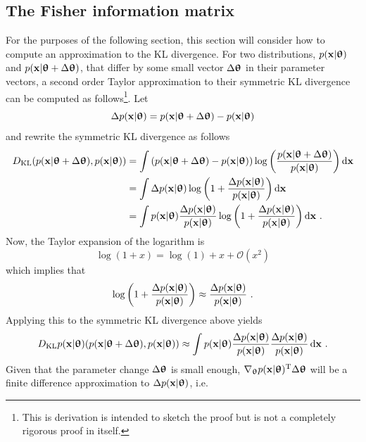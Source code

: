 \subsection{The Fisher information matrix}\label{sec: Natural Gradient - Fischer information matrix}
For the purposes of the following section, this section will consider how to compute an approximation to the \gls{KL} divergence.
For two distributions, $p(\x|\thetab)$ and $p(\x|\thetab+\Delta\thetab)$, that differ by some small vector $\Delta\thetab$ in their parameter vectors, a second order Taylor approximation to their symmetric \gls{KL} divergence can be computed as follows\footnote{This is derivation is intended to sketch the proof but is not a completely rigorous proof in itself.}. Let
$$\Delta p(\x|\thetab)=p(\x|\thetab+\Delta\thetab)-p(\x|\thetab)$$
and rewrite the symmetric \gls{KL} divergence as follows
\begin{align}
    D_\text{KL}(p(\x|\thetab+\Delta\thetab),p(\x|\thetab))
    &= \int \pa{p(\x|\thetab+\Delta\thetab)-p(\x|\thetab)}\log\pa{\frac{p(\x|\thetab+\Delta\thetab)}{p(\x|\thetab)}}\,\text{d}\x\nonumber\\
    &= \int \Delta p(\x|\thetab)\log\pa{1+\frac{\Delta p(\x|\thetab)}{p(\x|\thetab)}}\,\text{d}\x\nonumber\\
    &= \int p(\x|\thetab)\frac{\Delta p(\x|\thetab)}{p(\x|\thetab)}\log\pa{1+\frac{\Delta p(\x|\thetab)}{p(\x|\thetab)}}\,\text{d}\x \ .
\end{align}
Now, the Taylor expansion of the logarithm is
\begin{equation}
    \log (1+x) = \log(1) + x + \mathcal{O}(x^2)
\end{equation}
which implies that
\begin{equation}
    \log\pa{1+\frac{\Delta p(\x|\thetab)}{p(\x|\thetab)}} \approx \frac{\Delta p(\x|\thetab)}{p(\x|\thetab)} \ .
\end{equation}
Applying this to the symmetric \gls{KL} divergence above yields
\begin{equation}
    D_\text{KL}p(\x|\thetab)(p(\x|\thetab+\Delta\thetab),p(\x|\thetab)) \approx \int p(\x|\thetab) \frac{\Delta p(\x|\thetab)}{p(\x|\thetab)}\frac{\Delta p(\x|\thetab)}{p(\x|\thetab)}\,\text{d}\x \ .
\end{equation}
Given that the parameter change $\Delta\thetab$ is small enough, $\nabla_\thetab p(\x|\thetab)\transpose\Delta\thetab$ will be a finite difference approximation to $\Delta p(\x|\thetab)$, i.e.
